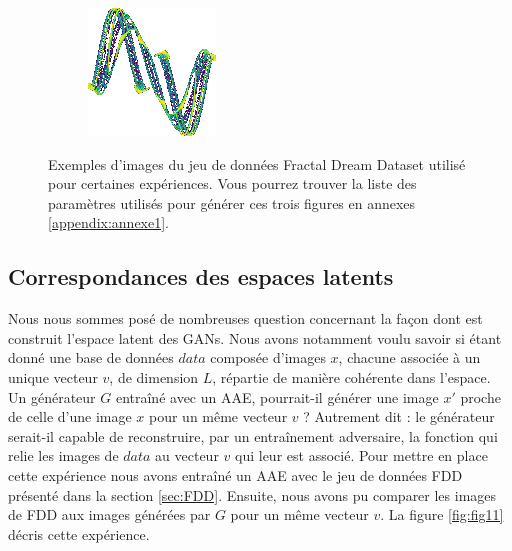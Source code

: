 \documentclass[11pt,francais]{article}
\begin{document}
\begin{figure}[h!]
\begin{subfigure}[b]{0.20\textwidth}
    \end{subfigure}
    \begin{subfigure}[b]{0.20\textwidth}
        \includegraphics[width=\textwidth]{Figures/FDD/-0,9333646250089_-0,3698044331245828_-1,9514116449042127_-0,376713271698188_-1,1759178511809651_-1,7157801385982319.png}
    \end{subfigure}
    \caption{Exemples d'images du jeu de données Fractal Dream Dataset utilisé pour certaines expériences. Vous pourrez trouver la liste des paramètres utilisés pour générer ces trois figures en annexes \ref{appendix:annexe1}.}
    \label{fig:fig2}
\end{figure}

\subsection{Correspondances des espaces latents}
\label{sec:CorrespondancesLS}
Nous nous sommes posé de nombreuses question concernant la façon dont est construit l'espace latent des GANs. 
Nous avons notamment voulu savoir si étant donné une base de données \(data\) composée d'images \(x\), chacune associée à un unique vecteur \(v\), de dimension \(L\), répartie de manière cohérente dans l'espace. Un générateur \(G\) entraîné avec un AAE, pourrait-il générer une image \(x'\) proche de celle d'une image \(x\) pour un même vecteur \(v\) ? Autrement dit : le générateur serait-il capable de reconstruire, par un entraînement adversaire, la fonction qui relie les images de \(data\) au vecteur \(v\) qui leur est associé. Pour mettre en place cette expérience nous avons entraîné un AAE avec le jeu de données FDD présenté dans la section \ref{sec:FDD}. Ensuite, nous avons pu comparer les images de FDD aux images générées par \(G\) pour un même vecteur \(v\). La figure \ref{fig:fig11} décris cette expérience.
\end{document}
